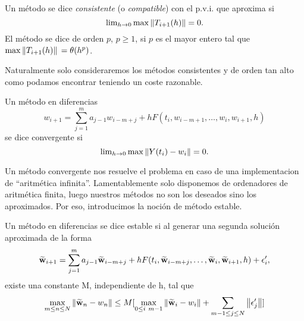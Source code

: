 \begin{definition}
    Un método se dice \emph{consistente} (o \emph{compatible})
    con el p.v.i. que aproxima si
    \begin{equation*}
        \lim\nolimits_{h\to 0} \max{\norm{T_{i+1}(h)}} = 0.
	\end{equation*}
	El método se dice de orden $p$, $p \geq 1$, si $p$ es el mayor entero
	tal que $\max{\norm*{T_{i+1}(h)}} = \theta(h^p)$.
\end{definition}

Naturalmente solo consideraremos los métodos consistentes y de orden tan
alto como podamos encontrar teniendo un coste razonable.

\begin{definition}
    Un método en diferencias
    \begin{equation*}
        w_{i+1} = \sum_{j=1}^m {a_{j-1}w_{i-m+j}}
            + hF(t_i,w_{i-m+1}, \dots, w_i,w_{i+1},h)
    \end{equation*}
    se dice convergente si
    \begin{equation*}
        \lim\nolimits_{h \to 0} \max{\norm{Y(t_i)-w_i}} = 0.
    \end{equation*}
\end{definition}

Un método convergente nos resuelve el problema en caso de una
implementacion de ``aritmética infinita''.
Lamentablemente solo disponemos de ordenadores de aritmética finita,
luego nuestros métodos no son los deseados sino los aproximados. %
Por eso, introducimos la noción de método estable.

\begin{definition}
    Un método en diferencias se dice estable
    si al generar una segunda solución aproximada de la forma
    \begin{equation*}
        \vb{\widetilde{w}}_{i+1} = \sum_{j=1}^m {a_{j-1}\vb{\widetilde{w}}_{i-m+j}}
            + h F(t_i,\vb{\widetilde{w}}_{i-m+j}, \dots, \vb{\widetilde{w}}_i,\vb{\widetilde{w}}_{i+1},h) + \epsilon'_i,
    \end{equation*}
    existe una constante M, independiente de h, tal que
    \begin{equation*} \label{stab}
        \max_{m \leq n \leq N}{\norm{\vb{\widetilde{w}}_n - w_n}} \leq M[
            \max_{0 \leq i \ m-1}{\norm{\vb{\widetilde{w}}_i - w_i}}
            + \sum_{m-1 \leq j \leq N} \norm{\epsilon'_j}
        ]
    \end{equation*}
\end{definition}

